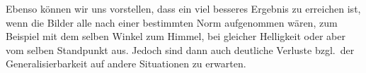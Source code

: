 \documentclass[a4,german]{article}
\begin{document}
Ebenso können wir uns vorstellen, dass ein viel besseres Ergebnis zu erreichen ist, wenn die Bilder alle nach einer bestimmten Norm aufgenommen wären, zum Beispiel mit dem selben Winkel zum Himmel, bei gleicher Helligkeit oder aber vom selben Standpunkt aus.
Jedoch sind dann auch deutliche Verluste bzgl.\ der Generalisierbarkeit auf andere Situationen zu erwarten.



\end{document}
